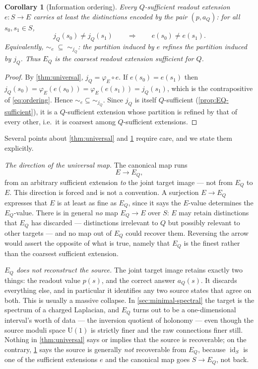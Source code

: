 \documentclass[11pt,reqno]{amsart}
\theoremstyle{plain}
\newtheorem{corollary}[theorem]{Corollary}
\theoremstyle{definition}
\newcommand{\Uone}{\mathrm{U}(1)}
\newcommand{\Src}{S}
\newcommand{\id}{\operatorname{id}}
\begin{document}
\begin{corollary}[Information ordering]\label{cor:ordering}
Every $Q$-sufficient readout extension $e\colon\Src\to E$ carries at least the distinctions
encoded by the pair $(p,a_Q)$: for all $s_0,s_1\in\Src$,
\begin{equation}\label{eq:ordering}
j_Q(s_0)\neq j_Q(s_1)
\qquad\Longrightarrow\qquad
e(s_0)\neq e(s_1).
\end{equation}
Equivalently, $\sim_e\;\subseteq\;\sim_{j_Q}$: the partition induced by $e$ refines the partition
induced by $j_Q$. Thus $E_Q$ is the \emph{coarsest} readout extension sufficient for $Q$.
\end{corollary}

\begin{proof}
By \cref{thm:universal}, $j_Q=\varphi_E\circ e$. If $e(s_0)=e(s_1)$ then
$j_Q(s_0)=\varphi_E(e(s_0))=\varphi_E(e(s_1))=j_Q(s_1)$, which is the contrapositive of
\eqref{eq:ordering}. Hence $\sim_e\subseteq\sim_{j_Q}$. Since $j_Q$ is itself $Q$-sufficient
(\cref{prop:EQ-sufficient}), it is a $Q$-sufficient extension whose partition is refined by that
of every other, i.e.\ it is coarsest among $Q$-sufficient extensions.
\end{proof}

Several points about \cref{thm:universal} and \cref{cor:ordering} require care, and we state them
explicitly.

\emph{The direction of the universal map.} The canonical map runs
\begin{equation*}
E\longrightarrow E_Q,
\end{equation*}
from an arbitrary sufficient extension \emph{to} the joint target image --- not from $E_Q$ to
$E$. This direction is forced and is not a convention. A surjection $E\to E_Q$ expresses that $E$
is at least as fine as $E_Q$, since it says the $E$-value determines the $E_Q$-value. There is in
general \emph{no} map $E_Q\to E$ over $\Src$: $E$ may retain distinctions that $E_Q$ has
discarded --- distinctions irrelevant to $Q$ but possibly relevant to other targets --- and no
map out of $E_Q$ could recover them. Reversing the arrow would assert the opposite of what is
true, namely that $E_Q$ is the finest rather than the coarsest sufficient extension.

\emph{$E_Q$ does not reconstruct the source.} The joint target image retains exactly two things:
the readout value $p(s)$, and the correct answer $a_Q(s)$. It discards everything else, and in
particular it identifies any two source states that agree on both. This is usually a massive
collapse. In \cref{sec:minimal-spectral} the target is the spectrum of a charged Laplacian, and
$E_Q$ turns out to be a one-dimensional interval's worth of data --- the inversion quotient of
holonomy --- even though the source moduli space $\Uone$ is strictly finer and the raw
connections finer still. Nothing in \cref{thm:universal} says or implies that the source is
recoverable; on the contrary, \cref{cor:ordering} says the source is generally \emph{not}
recoverable from $E_Q$, because $\id_\Src$ is one of the sufficient extensions $e$ and the
canonical map goes $\Src\to E_Q$, not back.
\end{document}
